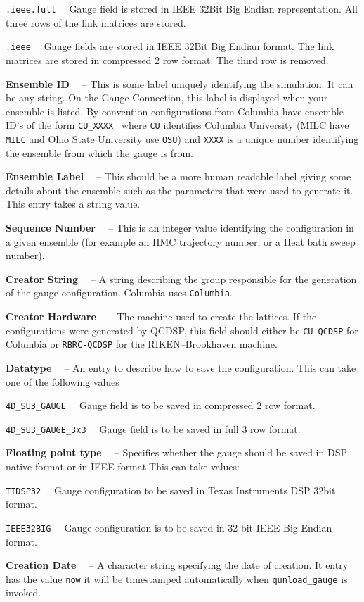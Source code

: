 \begin{description}
\begin{description}
\item{ \tt .ieee.full \ } Gauge field is stored in IEEE 32Bit Big Endian representation. All three rows of the link matrices are stored.
\item{ \tt .ieee \ } Gauge fields are stored in IEEE 32Bit Big Endian format. The link matrices are stored in compressed 2 row format. The third row is removed.
\end{description}
\item{\bf Ensemble ID \ } -- This is some label uniquely identifying the simulation. It can be any string. On the Gauge Connection, this label is displayed
when your ensemble is listed. By convention configurations from Columbia 
have ensemble ID's of the form {\tt CU\_XXXX } where {\tt CU} identifies
Columbia University (MILC have {\tt MILC} and Ohio State University use 
{\tt OSU}) and {\tt XXXX} is a unique number identifying the ensemble from 
which the gauge is from.
\item{\bf Ensemble Label \ } -- This should be a more human readable label
giving some details about the ensemble such as the parameters that
were used to generate it. This entry takes a string value.
\item{\bf Sequence Number \ } -- This is an integer value identifying 
the configuration in a given ensemble (for example an HMC trajectory number,
or a Heat bath sweep number).
\item{\bf Creator String \ } -- A string describing the group responsible
for the generation of the gauge configuration. Columbia uses {\tt Columbia}.
\item{\bf Creator Hardware \ } -- The machine used to create the lattices.
If the configurations were generated by QCDSP, this field should either be
{\tt CU-QCDSP} for Columbia or {\tt RBRC-QCDSP} for the RIKEN--Brookhaven
machine. 
\item{\bf Datatype \ } -- An entry to describe how to save the configuration.
This can take one of the following values
\begin{description}
\item{\tt 4D\_SU3\_GAUGE \ } Gauge field is to be saved in compressed 2 row
format.
\item{\tt 4D\_SU3\_GAUGE\_3x3 \ } Gauge field is to be saved in full 3 row format.
\end{description}
\item{\bf Floating point type \ } -- Specifies whether the gauge should be
saved in DSP native format or in IEEE format.This can take values:
\begin{description}
\item{\tt TIDSP32 \ } Gauge configuration to be saved in Texas Instruments
DSP 32bit format.
\item{\tt IEEE32BIG \ } Gauge configuration is to be saved in 32 bit IEEE
Big Endian format.
\end{description}
\item{\bf Creation Date \ } -- A character string specifying the date of 
creation. It entry has the value {\tt now} it will be timestamped automatically
when {\tt qunload\_gauge} is invoked.
\end{description}

